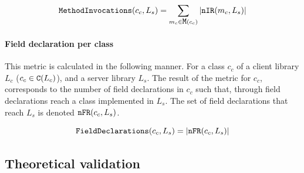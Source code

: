 \begin{equation}
\label{eqn:mi}
    \verb|MethodInvocations|(c_c, L_s) =  \sum_{m_c \in \verb|M|(c_c)} |\verb|nIR|(m_c, L_s)|
\end{equation}

\paragraph{Field declaration per class}
This metric is calculated in the following manner. For a class $c_c$ of a client library $L_c$ ($c_c \in \verb|C|(L_c)$), and a server library $L_s$. The result of the metric for $c_c$, corresponds to the number of field declarations in $c_c$ such that, through field declarations reach a class implemented in $L_s$. The set of field declarations that reach $L_s$ is denoted $\verb|nFR|(c_c, L_s)$.

\begin{equation}
\label{eqn:fd}
    \verb|FieldDeclarations|(c_c, L_s) = |\verb|nFR|(c_c, L_s)|
\end{equation}

\subsection{Theoretical validation}
